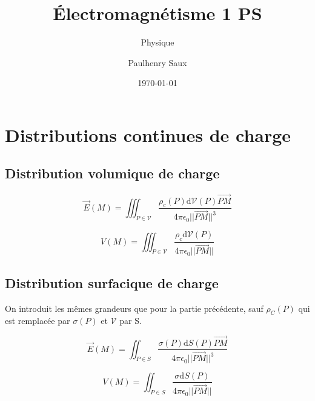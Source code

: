 \documentclass[french]{yLectureNote}
\title{Électromagnétisme 1 PS}
\subtitle{Physique}
\author{Paulhenry Saux}
\date{\today}
\renewcommand{\vec}{\overrightarrow}
\newcommand{\dd}{\mathrm{d}}
\newcommand{\norm}[1]{||\vec{#1}||}
\newcommand{\E}{\vec{E}(M)}
\newcommand{\V}{V(M)}
\newcommand{\mv}{\mathcal{V}}
\begin{document}
\setcounter{chapter}{3}
\chapter{Distributions continues de charge}
\section{Distribution volumique de charge}
%
%
%
%
 \begin{theorem}
\[\E = \iiint_{P\in\mv} \frac{\rho_c(P)\dd \mv(P)\vec{PM}}{4\pi\epsilon_0 \norm{PM}^3}\]
 \end{theorem}
 \begin{theorem}
\[V(M) = \iiint_{P\in \mv} \frac{\rho_c \dd \mv(P)}{4\pi\epsilon_0 \norm{PM}}\]
 \end{theorem}
 \section{Distribution surfacique de charge}
On introduit les m\^emes grandeurs que pour la partie précédente, sauf  \(\rho_C(P)\) qui est remplacée par  \(\sigma(P)\) et \(\mv\) par S.

 \begin{theorem}
\[\E = \iint_{P\in S} \frac{\sigma(P)\dd S(P)\vec{PM}}{4\pi\epsilon_0 \norm{PM}^3}\]
 \end{theorem}
 \begin{theorem}
\[V(M) = \iint_{P\in S} \frac{\sigma \dd S(P)}{4\pi\epsilon_0 \norm{PM}}\]
 \end{theorem}
\end{document}
